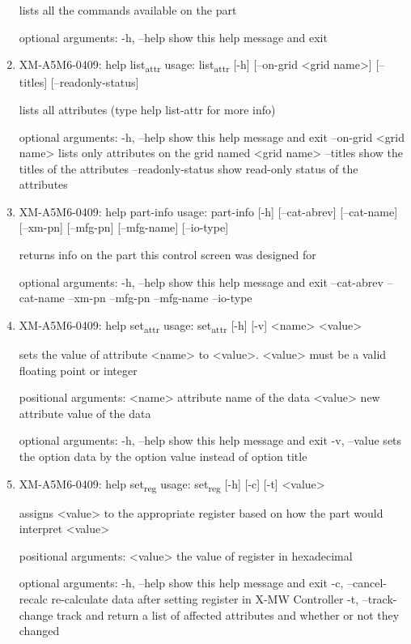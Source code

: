 \documentclass[11pt]{article}
\begin{document}
\begin{enumerate}
lists all the commands available on the part

optional arguments:
  -h, --help  show this help message and exit

\item XM-A5M6-0409: help list\textsubscript{attr}
\label{sec:org2a91109}
usage: list\textsubscript{attr} [-h] [--on-grid <grid name>] [--titles] [--readonly-status]

lists all attributes (type help list-attr for more info)

optional arguments:
  -h, --help            show this help message and exit
  --on-grid <grid name>
                        lists only attributes on the grid named <grid name>
  --titles              show the titles of the attributes
  --readonly-status     show read-only status of the attributes

\item XM-A5M6-0409: help part-info
\label{sec:orgf62a7f6}
usage: part-info  [-h] [--cat-abrev] [--cat-name] [--xm-pn] [--mfg-pn] [--mfg-name]
        [--io-type]

returns info on the part this control screen was designed for

optional arguments:
  -h, --help   show this help message and exit
  --cat-abrev
  --cat-name
  --xm-pn
  --mfg-pn
  --mfg-name
  --io-type

\item XM-A5M6-0409: help set\textsubscript{attr}
\label{sec:org958d7c2}
usage: set\textsubscript{attr} [-h] [-v] <name> <value>

sets the value of attribute <name> to <value>. <value> must be a valid
floating point or integer

positional arguments:
  <name>       attribute name of the data
  <value>      new attribute value of the data

optional arguments:
  -h, --help   show this help message and exit
  -v, --value  sets the option data by the option value instead of option
               title

\item XM-A5M6-0409: help set\textsubscript{reg}
\label{sec:orgb33620b}
usage: set\textsubscript{reg} [-h] [-c] [-t] <value>

assigns <value> to the appropriate register based on how the part would
interpret <value>

positional arguments:
  <value>              the value of register in hexadecimal

optional arguments:
  -h, --help           show this help message and exit
  -c, --cancel-recalc  re-calculate data after setting register in X-MW
                       Controller
  -t, --track-change   track and return a list of affected attributes and
                       whether or not they changed


\end{enumerate}
\end{document}
